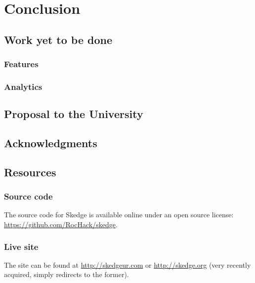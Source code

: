 
\chapter{Conclusion}

\section{Work yet to be done}

\subsection{Features}

\subsection{Analytics}


\section{Proposal to the University}


\section{Acknowledgments}


\section{Resources}

\subsection*{Source code}

The source code for Skedge is available online under an open source license:\\
\url{https://github.com/RocHack/skedge}.

\subsection*{Live site}

\noindent The site can be found at \url{http://skedgeur.com} or \url{http://skedge.org} (very recently acquired, simply redirects to the former).